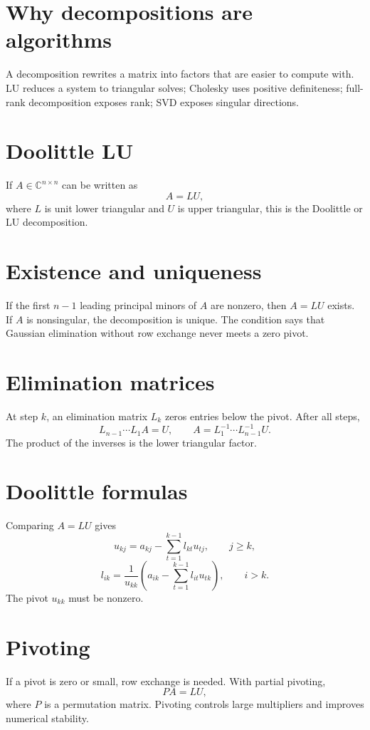 
\section{Why decompositions are algorithms}
A decomposition rewrites a matrix into factors that are easier to compute with.  LU reduces a system to triangular solves; Cholesky uses positive definiteness; full-rank decomposition exposes rank; SVD exposes singular directions.

\section{Doolittle LU}
If \(A\in\mathbb C^{n\times n}\) can be written as
\[
  A=LU,
\]
where \(L\) is unit lower triangular and \(U\) is upper triangular, this is the Doolittle or LU decomposition.

\section{Existence and uniqueness}
If the first \(n-1\) leading principal minors of \(A\) are nonzero, then \(A=LU\) exists.  If \(A\) is nonsingular, the decomposition is unique.  The condition says that Gaussian elimination without row exchange never meets a zero pivot.

\section{Elimination matrices}
At step \(k\), an elimination matrix \(L_k\) zeros entries below the pivot.  After all steps,
\[
  L_{n-1}\cdots L_1A=U,\qquad
  A=L_1^{-1}\cdots L_{n-1}^{-1}U.
\]
The product of the inverses is the lower triangular factor.

\section{Doolittle formulas}
Comparing \(A=LU\) gives
\[
  u_{kj}=a_{kj}-\sum_{t=1}^{k-1}l_{kt}u_{tj},\qquad j\ge k,
\]
\[
  l_{ik}=\frac{1}{u_{kk}}\left(a_{ik}-\sum_{t=1}^{k-1}l_{it}u_{tk}\right),\qquad i>k.
\]
The pivot \(u_{kk}\) must be nonzero.

\section{Pivoting}
If a pivot is zero or small, row exchange is needed.  With partial pivoting,
\[
  PA=LU,
\]
where \(P\) is a permutation matrix.  Pivoting controls large multipliers and improves numerical stability.

